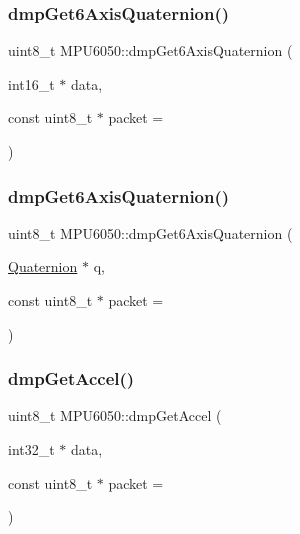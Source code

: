 \mbox{\label{classMPU6050_a9c074fce94329c3f41aa6cddc2080358}} 
\subsubsection{\texorpdfstring{dmpGet6AxisQuaternion()}{dmpGet6AxisQuaternion()}\hspace{0.1cm}{\footnotesize\ttfamily [2/3]}}
{\footnotesize\ttfamily uint8\+\_\+t M\+P\+U6050\+::dmp\+Get6\+Axis\+Quaternion (\begin{DoxyParamCaption}\item[{int16\+\_\+t $\ast$}]{data,  }\item[{const uint8\+\_\+t $\ast$}]{packet = {} }\end{DoxyParamCaption})}

\mbox{\label{classMPU6050_a2fff9f9904645926472a7527b20d2330}} 
\subsubsection{\texorpdfstring{dmpGet6AxisQuaternion()}{dmpGet6AxisQuaternion()}\hspace{0.1cm}{\footnotesize\ttfamily [3/3]}}
{\footnotesize\ttfamily uint8\+\_\+t M\+P\+U6050\+::dmp\+Get6\+Axis\+Quaternion (\begin{DoxyParamCaption}\item[{\mbox{\hyperlink{classQuaternion}{Quaternion}} $\ast$}]{q,  }\item[{const uint8\+\_\+t $\ast$}]{packet = {} }\end{DoxyParamCaption})}

\mbox{\label{classMPU6050_a113be793514449548008fe1eae5459ef}} 
\subsubsection{\texorpdfstring{dmpGetAccel()}{dmpGetAccel()}\hspace{0.1cm}{\footnotesize\ttfamily [1/3]}}
{\footnotesize\ttfamily uint8\+\_\+t M\+P\+U6050\+::dmp\+Get\+Accel (\begin{DoxyParamCaption}\item[{int32\+\_\+t $\ast$}]{data,  }\item[{const uint8\+\_\+t $\ast$}]{packet = {} }\end{DoxyParamCaption})}



